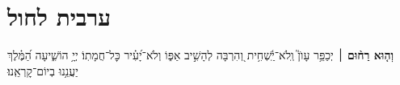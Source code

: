 \documentclass[twoside, openany, parskip=half, 11pt]{book}
\begin{document}
\fullkaddish

\aleinu





%
\chapter[ערבית לחול]{ ערבית לחול }

\textbf{וְה֤וּא רַח֨וּם}
׀ יְכַפֵּ֥ר עָוֺן֮ וְֽלֹא־יַֽ֫שְׁחִ֥ית וְ֭הִרְבָּה לְהָשִׁ֣יב אַפּ֑וֹ וְלֹא־יָ֝עִ֗יר כׇּל־חֲמָתֽוֹ׃
יְיָ֥ הוֹשִׁ֑יעָה הַ֝מֶּ֗לֶךְ יַעֲנֵ֥נוּ בְיוֹם־קׇרְאֵֽנוּ׃


\barachu


\hamaarivaravim

\ahavasolam

\shema

\veahavta

\vehaya

\vayomer{}

\newcommand{\barukhbayom}{}

\newcommand{\yerueinnu}{

\firstword{יִרְאוּ}
עֵינֵֽינוּ וְיִשְׂמַח לִבֵּֽנוּ וְתָגֵל נַפְשֵֽׁנוּ בִּישׁוּעָתְךָ בֶּאֱמֶת בֶּאֱמֹר לְצִיּוֹן מָלַךְ אֱלֹהָֽיִךְ׃
\melekhmalakhyimlokh
כִּי הַמַּלְכוּת שֶׁלְּךָ הִיא וּלְעֽוֹלְמֵי עַד תִּמְלֹךְ בְּכָבוֹד כִּי אֵין לָֽנוּ מֶֽלֶךְ אֶלָּא אַֽתָּה׃
}
\end{document}
